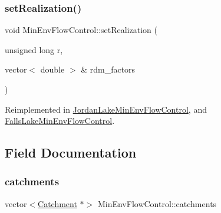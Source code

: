 \mbox{\label{classMinEnvFlowControl_aff9774bd700410f9cd9a04e323f824c8_aff9774bd700410f9cd9a04e323f824c8}} 
\subsubsection{\texorpdfstring{set\+Realization()}{setRealization()}}
{\footnotesize\ttfamily void Min\+Env\+Flow\+Control\+::set\+Realization (\begin{DoxyParamCaption}\item[{unsigned long}]{r,  }\item[{vector$<$ double $>$ \&}]{rdm\+\_\+factors }\end{DoxyParamCaption})\hspace{0.3cm}{\ttfamily [virtual]}}



Reimplemented in \mbox{\hyperlink{classJordanLakeMinEnvFlowControl_aa1e816121060212f3dbeffda90a7baec_aa1e816121060212f3dbeffda90a7baec}{Jordan\+Lake\+Min\+Env\+Flow\+Control}}, and \mbox{\hyperlink{classFallsLakeMinEnvFlowControl_a6ea8a5e9ff9179066cceb77d896f3f97_a6ea8a5e9ff9179066cceb77d896f3f97}{Falls\+Lake\+Min\+Env\+Flow\+Control}}.



\subsection{Field Documentation}
\mbox{\label{classMinEnvFlowControl_a99502573f30daf84d9ad7a2f62197b77_a99502573f30daf84d9ad7a2f62197b77}} 
\subsubsection{\texorpdfstring{catchments}{catchments}}
{\footnotesize\ttfamily vector$<$\mbox{\hyperlink{classCatchment}{Catchment}} $\ast$$>$ Min\+Env\+Flow\+Control\+::catchments\hspace{0.3cm}{\ttfamily [protected]}}


